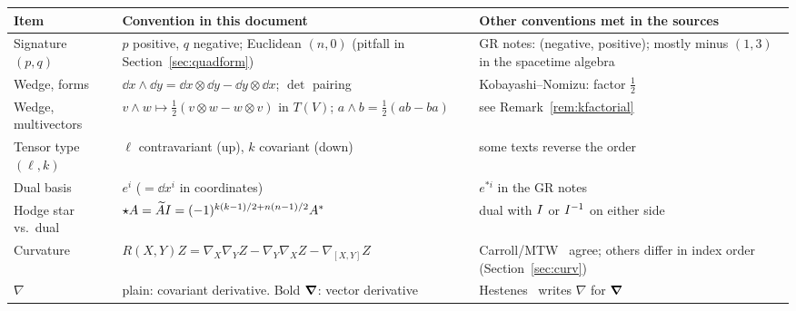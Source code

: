 \begin{center}
\small
\renewcommand{\arraystretch}{1.3}
\begin{tabular}{@{}p{3.1cm}p{5.4cm}p{5.8cm}@{}}
\toprule
\textbf{Item} & \textbf{Convention in this document} & \textbf{Other conventions met in the sources}\\
\midrule
Signature $(p,q)$ & $p$ positive, $q$ negative; Euclidean $(n,0)$ (pitfall in Section~\ref{sec:quadform}) & GR notes: (negative, positive); mostly minus $(1,3)$ in the spacetime algebra\\
Wedge, forms & $\dd x\wedge\dd y=\dd x\otimes\dd y-\dd y\otimes\dd x$; $\det$ pairing & Kobayashi--Nomizu: factor $\frac12$\\
Wedge, multivectors & $v\wedge w\mapsto\frac12(v\otimes w-w\otimes v)$ in $T(V)$; $a\wedge b=\frac12(ab-ba)$ & see Remark~\ref{rem:kfactorial}\\
Tensor type $(\ell,k)$ & $\ell$ contravariant (up), $k$ covariant (down) & some texts reverse the order\\
Dual basis & $e^i$ ($=\dd x^i$ in coordinates) & $e^{*i}$ in the GR notes\\
Hodge star vs.\ dual & $\star A=\widetilde{A}I=(-1)^{k(k-1)/2+n(n-1)/2}A^{\ast}$ & dual with $I$ or $I^{-1}$ on either side\\
Curvature & $R(X,Y)Z=\nabla_X\nabla_YZ-\nabla_Y\nabla_XZ-\nabla_{[X,Y]}Z$ & Carroll/MTW~\cite{Carroll,MTW} agree; others differ in index order (Section~\ref{sec:curv})\\
$\nabla$ & plain: covariant derivative. Bold $\boldsymbol{\nabla}$: vector derivative & Hestenes~\cite{HS} writes $\nabla$ for $\boldsymbol{\nabla}$\\
\bottomrule
\end{tabular}
\end{center}
